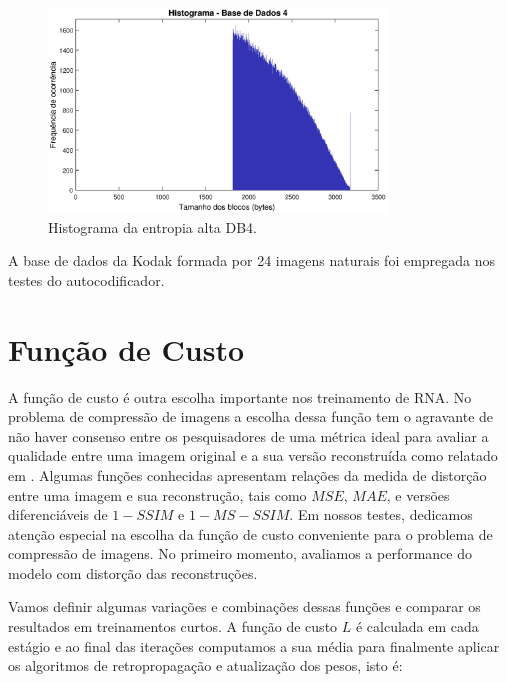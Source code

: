 \begin{figure}
\centering
\includegraphics[width=0.8\textwidth]{figuras/hist4.eps}
\caption{Histograma da entropia alta DB4.}
\label{fig:database4}
\end{figure}		

A base de dados da Kodak \cite{kodak} formada por 24 imagens naturais foi empregada nos testes do autocodificador.  

\section {Função de Custo}

A função de custo é outra escolha importante nos treinamento de RNA. No problema de compressão de imagens a escolha dessa função tem o agravante de não haver consenso entre os pesquisadores de uma métrica ideal para avaliar a qualidade entre uma imagem original e a sua versão reconstruída como relatado em \cite{Priming2017Johnston,End2016Balle}.  
Algumas funções conhecidas apresentam relações da medida de distorção entre uma imagem e sua reconstrução, tais como $MSE$, $MAE$, e versões diferenciáveis de $1-SSIM$ e $1-MS-SSIM$. Em nossos testes, dedicamos atenção especial na escolha da função de custo conveniente para o problema de compressão de imagens. No primeiro momento,
avaliamos a performance do modelo com  distorção das reconstruções.

Vamos definir algumas variações e combinações dessas funções e comparar os resultados em treinamentos curtos.
A função de custo $L$ é calculada em cada estágio e ao final das iterações computamos a sua média para finalmente aplicar os algoritmos de retropropagação e atualização dos pesos, isto é:

